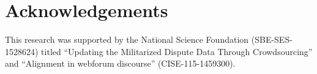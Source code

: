 \section*{Acknowledgements}
This research was supported by the National Science Foundation (SBE-SES-1528624) titled ``Updating the Militarized Dispute Data Through Crowdsourcing'' and ``Alignment in webforum discourse'' (CISE-115-1459300).